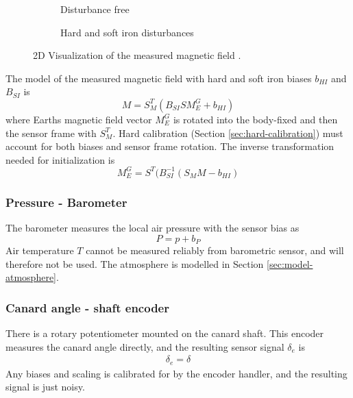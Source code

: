 \begin{figure}[ht!]
    \centering
    \begin{subfigure}{0.4\textwidth}
        \resizebox{0.7\textwidth}{!}{
        }
        \caption{Disturbance free}
        \label{fig:meas-mag-free}
    \end{subfigure}
    \begin{subfigure}{0.4\textwidth}
        \resizebox{0.7\textwidth}{!}{
        }
        \caption{Hard and soft iron disturbances}
        \label{fig:meas-mag-dist}
    \end{subfigure}
    \caption[2D Visualization of the measured magnetic field.]{2D Visualization of the measured magnetic field \cite{vectornav2024}.}
    \label{fig:meas-mag}
\end{figure}

The model of the measured magnetic field with hard and soft iron biases $b_{HI}$ and $B_{SI}$ is 
\begin{equation}
    M = S_M^T ( B_{SI} S M_E^G + b_{HI} ) \label{eq:meas-mag}
\end{equation}
where Earths magnetic field vector $M_E^G$ is rotated into the body-fixed and then the sensor frame with $S_M^T$.
Hard calibration (Section \ref{sec:hard-calibration}) must account for both biases and sensor frame rotation.
The inverse transformation needed for initialization is 
\begin{equation}
    M_E^G = S^T ( B_{SI}^{-1} (S_M M - b_{HI} ) \label{eq:meas-mag-init}
\end{equation}

\subsubsection{Pressure - Barometer}
The barometer measures the local air pressure with the sensor bias as
\begin{equation}
    P = p + b_P
\end{equation}
Air temperature $T$ cannot be measured reliably from barometric sensor, and will therefore not be used.
The atmosphere is modelled in Section \ref{sec:model-atmosphere}.

\subsubsection{Canard angle - shaft encoder}
There is a rotary potentiometer mounted on the canard shaft.
This encoder measures the canard angle directly, and the resulting sensor signal $\delta_e$ is 
\begin{align}
    \delta_e = \delta
\end{align}
Any biases and scaling is calibrated for by the encoder handler, and the resulting signal is just noisy. 

